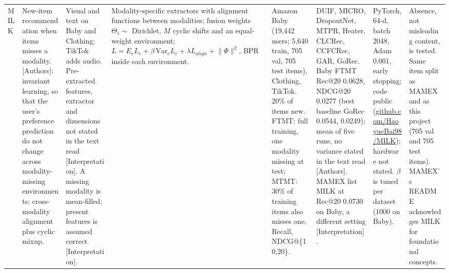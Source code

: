 \documentclass[conference]{IEEEtran}
\begin{document}
\begin{longtable}{@{}p{1.6cm}*{7}{>{\raggedright\arraybackslash}p{2.2cm}}@{}}
MILK~\cite{bai2024milk} & New-item recommendation when items misses a modality. [Authors]: invariant learning, so that the user's preference prediction do not change across modality-missing environments; cross-modality alignment plus cyclic mixup. & Visual and text on Baby and Clothing; TikTok adds audio. Pre-extracted features, extractor and dimensions not stated in the text read [Interpretation]. A missing modality is mean-filled; present features is assumed correct [Interpretation]. & Modality-specific extractors with alignment functions between modalities; fusion weights $\Theta_1\sim$ Dirichlet, $M$ cyclic shifts and an equal-weight environment; $L = E_e L_e + \beta\,\mathrm{Var}_e L_e + \lambda L_{align} + \lVert\Phi\rVert^2$, BPR inside each environment. & Amazon Baby (19,442 users; 5,640 train, 705 val, 705 test items), Clothing, TikTok. 20\% of items new. FTMT: full training, one modality missing at test; MTMT: 30\% of training items also misses one. Recall, NDCG@\{10,20\}. & DUIF, MICRO, DropoutNet, MTPR, Heater, CLCRec, CCFCRec, GAR, GoRec. Baby FTMT Rec@20 0.0628, NDCG@20 0.0277 (best baseline GoRec 0.0544, 0.0249); mean of five runs, no variance stated in the text read [Authors]. MAMEX list MILK at Rec@20 0.0730 on Baby, a different setting [Interpretation]. & PyTorch, 64-d, batch 2048, Adam 0.001, early stopping; code public (\url{github.com/HaoyueBai98/MILK}); hardware not stated. $\beta$ is tuned per dataset (1000 on Baby). & Absence, not misleading content, is tested. Same item split as MAMEX and as this project (705 val and 705 test items). MAMEX's README acknowledges MILK for foundational concepts. \\
\end{longtable}
\endgroup
\end{document}
